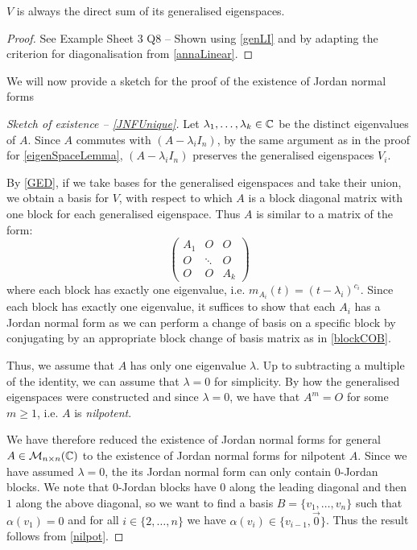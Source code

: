 \documentclass[../main.tex]{subfiles}
\begin{document}
\begin{theorem}
  $V$ is always the direct sum of its generalised eigenspaces. \label{GED}
\end{theorem}
\begin{proof}
  See Example Sheet 3 Q8 -- Shown using \cref{genLI} and by adapting the criterion for diagonalisation from \cref{annaLinear}.
\end{proof}
We will now provide a sketch for the proof of the existence of Jordan normal forms
\nonexaminable
\begin{proof}[Sketch of existence -- \cref{JNFUnique}]
  Let $\lambda_1, \ldots, \lambda_k \in \mathbb{C}$ be the distinct eigenvalues of $A$.
  Since $A$ commutes with $(A - \lambda_i I_n)$, by the same argument as in the proof for \cref{eigenSpaceLemma}, $(A - \lambda_i I_n)$ preserves the generalised eigenspaces $V_i$.

  By \cref{GED}, if we take bases for the generalised eigenspaces and take their union, we obtain a basis for $V$, with respect to which $A$ is a block diagonal matrix with one block for each generalised eigenspace.
  Thus $A$ is similar to a matrix of the form:
  \[
    \left(\begin{array}{c|c|c}
      A_1 & O & O \\ \hline
      O & \ddots & O \\ \hline
      O & O & A_k
    \end{array}\right)
  \]
  where each block has exactly one eigenvalue, i.e. $m_{A_i}(t) = (t - \lambda_i)^{c_i}$.
  Since each block has exactly one eigenvalue, it suffices to show that each $A_i$ has a Jordan normal form as we can perform a change of basis on a specific block by conjugating by an appropriate block change of basis matrix as in \cref{blockCOB}.

  Thus, we assume that $A$ has only one eigenvalue $\lambda$.
  Up to subtracting a multiple of the identity, we can assume that $\lambda = 0$ for simplicity.
  By how the generalised eigenspaces were constructed and since $\lambda = 0$, we have that $A^{m} = O$ for some $m \geq 1$, i.e. $A$ is \textit{nilpotent}.

  We have therefore reduced the existence of Jordan normal forms for general $A \in \mathcal{M}_{n \times n}(\mathbb{C})$ to the existence of Jordan normal forms for nilpotent $A$.
  Since we have assumed $\lambda = 0$, the its Jordan normal form can only contain $0$-Jordan blocks.
  We note that $0$-Jordan blocks have 0 along the leading diagonal and then $1$ along the above diagonal, so we want to find a basis $B = \{v_1, \ldots, v_n\}$ such that $\alpha(v_1) = 0$ and for all $i \in \{2, \ldots, n\}$ we have $\alpha(v_i) \in \{v_{i - 1}, \vec{0}\}$.
  Thus the result follows from \cref{nilpot}.
\end{proof}
\end{document}
